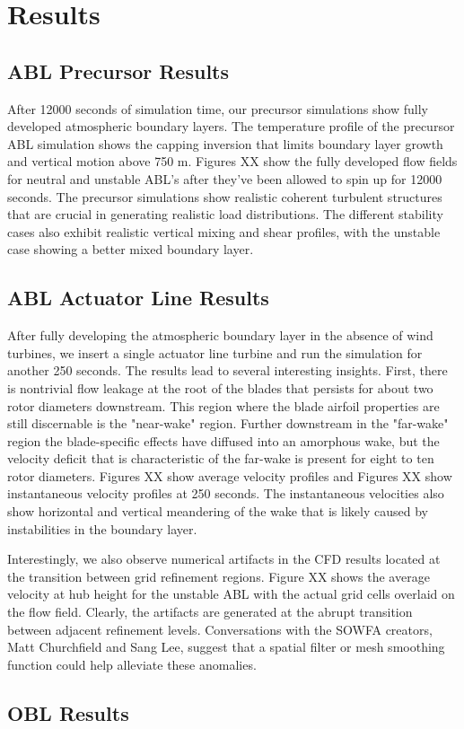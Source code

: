 \section{Results}

\subsection{ABL Precursor Results}
After 12000 seconds of simulation time, our precursor simulations show fully developed atmospheric boundary layers.  The temperature profile of the precursor ABL simulation shows the capping inversion that limits boundary layer growth and vertical motion above 750 m.  Figures XX show the fully developed flow fields for neutral and unstable ABL's after they've been allowed to spin up for 12000 seconds.  The precursor simulations show realistic coherent turbulent structures that are crucial in generating realistic load distributions.  The different stability cases also exhibit realistic vertical mixing and shear profiles, with the unstable case showing a better mixed boundary layer.

\subsection{ABL Actuator Line Results}
After fully developing the atmospheric boundary layer in the absence of wind turbines, we insert a single actuator line turbine and run the simulation for another 250 seconds.  The results lead to several interesting insights.  First, there is nontrivial flow leakage at the root of the blades that persists for about two rotor diameters downstream.  This region where the blade airfoil properties are still discernable is the "near-wake" region\cite{sanderse_review_2011}.  Further downstream in the "far-wake" region the blade-specific effects have diffused into an amorphous wake, but the velocity deficit that is characteristic of the far-wake is present for eight to ten rotor diameters.  Figures XX show average velocity profiles and Figures XX show instantaneous velocity profiles at 250 seconds.  The instantaneous velocities also show horizontal and vertical meandering of the wake that is likely caused by instabilities in the boundary layer.

Interestingly, we also observe numerical artifacts in the CFD results located at the transition between grid refinement regions.  Figure XX shows the average velocity at hub height for the unstable ABL with the actual grid cells overlaid on the flow field.  Clearly, the artifacts are generated at the abrupt transition between adjacent refinement levels.  Conversations with the SOWFA creators, Matt Churchfield and Sang Lee, suggest that a spatial filter or mesh smoothing function could help alleviate these anomalies.



\subsection{OBL Results}

